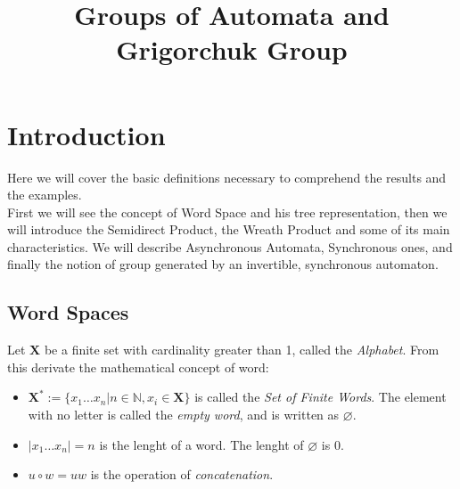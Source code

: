 \documentclass[mat1]{fmfdeloTS}
\title{Groups of Automata and Grigorchuk Group} %
\newcommand{\N}{\mathbb N}
\newcommand{\abece}{\mathbf X}
\newcommand{\fslovar}{\mathbf{X^*}}
\begin{document}



\section{Introduction}
Here we will cover the basic definitions necessary to comprehend the results and the examples.\\First we will see the concept of Word Space and his tree representation, then we will introduce the Semidirect Product, the Wreath Product  and some of its main characteristics. We will describe Asynchronous Automata, Synchronous ones, and finally the notion of group generated by an invertible, synchronous automaton.

\subsection{Word Spaces}
Let $\abece$ be a finite set with cardinality greater than 1, called the \textit{Alphabet}. From this derivate the mathematical concept of word:

\begin{definition}
\begin{itemize}
\item $\fslovar:=\{x_1\dots x_n|n\in\N, x_i\in\abece \}$ is called the \textit{Set of Finite Words}.  The element with no letter is called the \textit{empty word}, and is written as $\varnothing$.
\item $|x_1\dots x_n|=n$  is the lenght of a word. The lenght of $\varnothing$ is 0.
\item $u \circ w=uw$ is the operation of \textit{concatenation}.
\end{itemize}
\end{definition}
\end{document}

